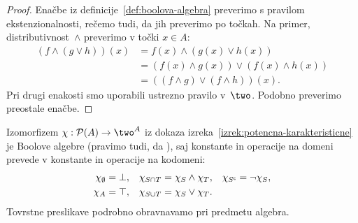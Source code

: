 \begin{proof}
  Enačbe iz definicije~\ref{def:boolova-algebra} preverimo s pravilom ekstenzionalnosti, rečemo tudi, da jih
  preverimo po točkah.
  Na primer, distributivnost~$\land$ preverimo v točki $x \in A$:
  \begin{align*}
    (f \land (g \lor h))(x)
    &= f(x) \land (g(x) \lor h(x)) \\
    &= (f(x) \land g(x)) \lor (f(x) \land h(x)) \\
    &= ((f \land g) \lor (f \land h))(x).
  \end{align*}
  Pri drugi enakosti smo uporabili ustrezno pravilo v~$\two$.
  Podobno preverimo preostale enačbe.
\end{proof}

Izomorfizem $\chi : \pow{A} \to \two^A$ iz dokaza izreka~\ref{izrek:potencna-karakteristicne} je  Boolove algebre (pravimo tudi, da ), saj konstante in operacije na domeni prevede v konstante in operacije na kodomeni:
%
\begin{align*}
  \chi_\emptyset &= \bot, &
  \chi_{S \cap T} &= \chi_S \land \chi_T, &
  \chi_{S^{\mathsf{c}}} &= \neg \chi_S, \\
  \chi_A &= \top, &
  \chi_{S \cup T} &= \chi_S \lor \chi_T.
\end{align*}
%
Tovrstne preslikave podrobno obravnavamo pri predmetu algebra.
